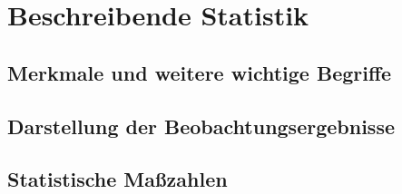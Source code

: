 \section{Beschreibende Statistik}

\subsection{Merkmale und weitere wichtige Begriffe}

\subsection{Darstellung der Beobachtungsergebnisse}

\subsection{Statistische Maßzahlen}